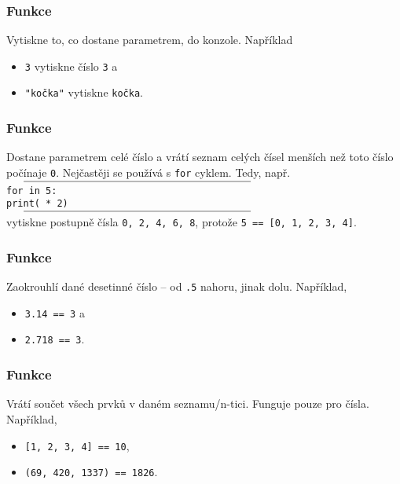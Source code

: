 \begin{frame}
 \frametitle{Funkce \texttt{}}
 \begin{block}{Vytiskne to, co dostane parametrem, do konzole.}
  \pause
  \vspace{1ex}
  Například
  \begin{itemize}
   \item \texttt{3\mlb{)}} vytiskne číslo \texttt{3} a
   \item \texttt{"kočka"\mlb{)}} vytiskne \texttt{kočka}.
  \end{itemize}
 \end{block}
\end{frame}

\begin{frame}
 \frametitle{Funkce \texttt{}}
 \begin{block}{Dostane parametrem celé číslo a vrátí seznam celých čísel menších
  než toto číslo počínaje \texttt{0}.}
  \pause
  \vspace{1ex}
  Nejčastěji se používá s \texttt{for} cyklem. Tedy, např.
  $\vcenter{\rule{.6\textwidth}{0.4pt}}$
  \texttt{for  in 5\mlb{)}:}\\
  \hspace{4ex}\texttt{print( * 2)}
  $\vcenter{\rule{.6\textwidth}{0.4pt}}$
  vytiskne postupně čísla \texttt{0, 2, 4, 6, 8}, protože
  \texttt{5\mlb{)} == [0, 1, 2, 3, 4]}.
 \end{block}
\end{frame}

\begin{frame}
 \frametitle{Funkce \texttt{}}
 \begin{block}{Zaokrouhlí dané desetinné číslo -- od \texttt{.5} nahoru, jinak
  dolu.}
  \pause
  Například,
  \begin{itemize}
   \item \texttt{3.14\mlb{)} == 3} a
   \item \texttt{2.718\mlb{)} == 3}.
  \end{itemize}
 \end{block}
\end{frame}

\begin{frame}
 \frametitle{Funkce \texttt{}}
 \begin{block}{Vrátí součet všech prvků v daném seznamu/n-tici. Funguje pouze
  pro čísla.}
  \pause
  Například,
  \begin{itemize}
   \item \texttt{[1, 2, 3, 4]\mlb{)} == 10},
   \item \texttt{(69, 420, 1337)\mlb{)} == 1826}.
  \end{itemize}
 \end{block}
\end{frame}

